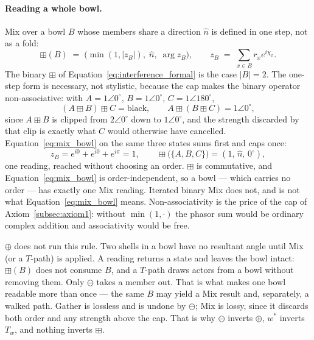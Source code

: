 \documentclass[12pt, a4paper]{article}
\begin{document}
\paragraph{Reading a whole bowl.}
Mix over a bowl $B$ whose members share a direction $\hat n$ is
defined in one step, not as a fold:
\begin{equation}
    \boxplus(B)
    \;=\;
    \bigl(\min(1,|z_B|),\;\hat n,\;\arg z_B\bigr),
    \qquad
    z_B \;=\; \sum_{x\in B} r_x e^{i\chi_x}.
    \label{eq:mix_bowl}
\end{equation}
The binary $\boxplus$ of Equation~\eqref{eq:interference_formal} is
the case $|B|=2$. The one-step form is necessary, not stylistic,
because the cap makes the binary operator non-associative: with
$A=1\angle 0^\circ$, $B=1\angle 0^\circ$, $C=1\angle 180^\circ$,
\[
(A\boxplus B)\boxplus C=\text{black},
\qquad
A\boxplus(B\boxplus C)=1\angle 0^\circ ,
\]
since $A\boxplus B$ is clipped from $2\angle 0^\circ$ down to
$1\angle 0^\circ$, and the strength discarded by that clip is exactly
what $C$ would otherwise have cancelled.
Equation~\eqref{eq:mix_bowl} on the same three states sums first and
caps once:
\[
z_B = e^{i0}+e^{i0}+e^{i\pi} = 1,
\qquad
\boxplus\bigl(\{A,B,C\}\bigr) = (1,\,\hat n,\,0^\circ),
\]
one reading, reached without choosing an order. $\boxplus$ is
commutative,
and Equation~\eqref{eq:mix_bowl} is order-independent, so a bowl ---
which carries no order --- has exactly one Mix reading. Iterated
binary Mix does not, and is not what
Equation~\eqref{eq:mix_bowl} means. Non-associativity is the price of
the cap of Axiom~\ref{subsec:axiom1}: without $\min(1,\cdot)$ the
phasor sum would be ordinary complex addition and associativity would
be free.

$\oplus$ does not run this rule. Two shells in a bowl have no
resultant angle until Mix (or a $T$-path) is applied.
A reading returns a state and leaves the bowl intact: $\boxplus(B)$
does not consume $B$, and a $T$-path draws actors from a bowl without
removing them. Only $\ominus$ takes a member out. That is what makes
one bowl readable more than once --- the same $B$ may yield a Mix
result and, separately, a walked path.
Gather is lossless and is undone by $\ominus$; Mix is lossy, since it
discards both order and any strength above the cap. That is why
$\ominus$ inverts $\oplus$, $w^{*}$ inverts $T_w$, and nothing inverts
$\boxplus$.
\end{document}
